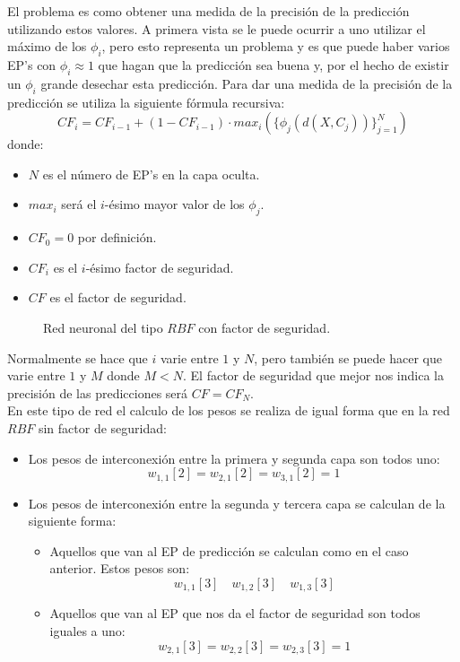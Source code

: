 El problema es como obtener una medida de la precisi\'on de la predicci\'on
utilizando estos valores. A primera vista se le puede ocurrir a uno utilizar
el m\'aximo de los $\phi_i$, pero esto representa un problema y es que puede
haber varios EP's con $\phi_i \approx 1$ que hagan que la predicci\'on sea
buena y, por el hecho de existir un $\phi_i$ grande desechar esta
predicci\'on.
%
\newpage
%
Para dar una medida de la precisi\'on de la predicci\'on se utiliza la siguiente
f\'ormula recursiva:
\begin{equation}\label{eq:FormulaRecursiva}
CF_i=CF_{i-1}+(1-CF_{i-1})\cdot max_{i}(\{\phi_j(d(X,C_j))\}_{j=1}^N)
\end{equation}
donde:
\begin{itemize}
\item $N$ es el n\'umero de EP's en la capa oculta.
\item $max_i$ ser\'a el $i$-\'esimo mayor valor de los $\phi_j$.
\item $CF_0 = 0$ por definici\'on.
\item $CF_i$ es el $i$-\'esimo factor de seguridad.
\item $CF$ es el factor de seguridad.
\end{itemize}
%
\begin{figure}[!h]

\caption{Red neuronal del tipo $RBF$ con factor de seguridad.}
\end{figure}
%

Normalmente se hace que $i$ varie entre $1$ y $N$, pero tambi\'en se puede hacer
que varie entre $1$ y $M$ donde $M<N$. El factor de seguridad que mejor nos
indica la precisi\'on de las predicciones ser\'a $CF=CF_N$.\\

En este tipo de red el calculo de los pesos se realiza de igual forma que en la
red $RBF$ sin factor de seguridad:
\begin{itemize}
\item Los pesos de interconexi\'on entre la primera y segunda capa son todos
uno:
\begin{displaymath}
w_{1,1}[2]=w_{2,1}[2]=w_{3,1}[2]=1
\end{displaymath}
\item Los pesos de interconexi\'on entre la segunda y tercera capa se calculan
de la siguiente forma:
\begin{itemize}
\item Aquellos que van al EP de predicci\'on se calculan como en el caso
anterior. Estos pesos son:
\begin{displaymath}
w_{1,1}[3]\quad w_{1,2}[3]\quad w_{1,3}[3]
\end{displaymath}
\item Aquellos que van al EP que nos da el factor de seguridad son todos iguales
a uno:
\begin{displaymath}
w_{2,1}[3]=w_{2,2}[3]=w_{2,3}[3]=1
\end{displaymath}
\end{itemize}
\end{itemize}
